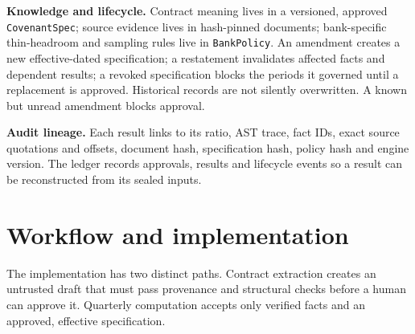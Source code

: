 \documentclass[10pt,letterpaper]{article}
\newcommand{\ct}[1]{\texttt{\small #1}}
\begin{document}
\textbf{Knowledge and lifecycle.} Contract meaning lives in a versioned, approved \ct{CovenantSpec}; source evidence lives in hash-pinned documents; bank-specific thin-headroom and sampling rules live in \ct{BankPolicy}. An amendment creates a new effective-dated specification; a restatement invalidates affected facts and dependent results; a revoked specification blocks the periods it governed until a replacement is approved. Historical records are not silently overwritten. A known but unread amendment blocks approval.

\textbf{Audit lineage.} Each result links to its ratio, AST trace, fact IDs, exact source quotations and offsets, document hash, specification hash, policy hash and engine version. The ledger records approvals, results and lifecycle events so a result can be reconstructed from its sealed inputs.

\section{Workflow and implementation}
The implementation has two distinct paths. Contract extraction creates an untrusted draft that must pass provenance and structural checks before a human can approve it. Quarterly computation accepts only verified facts and an approved, effective specification.
\end{document}
